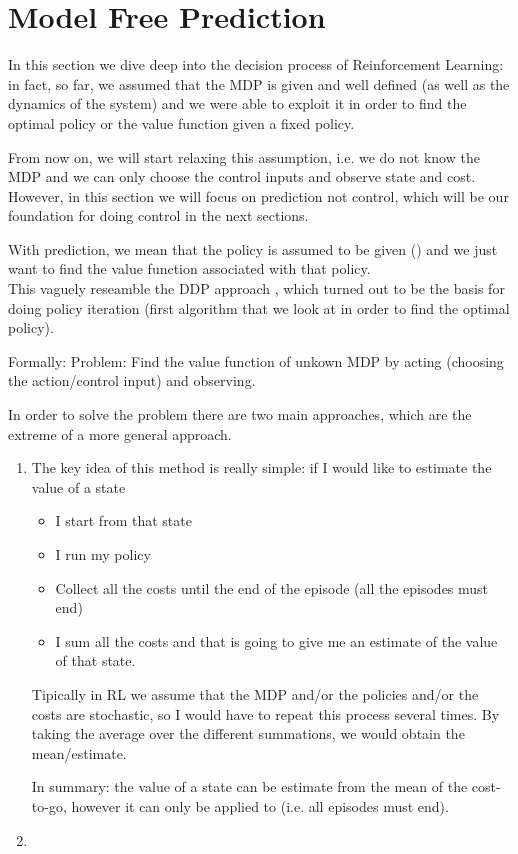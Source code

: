 \section{Model Free Prediction}
In this section we dive deep into the decision process of Reinforcement Learning: in fact, so far, we assumed that the MDP is given and well defined (as well as the dynamics of the system) and we were able to exploit it in order to find the optimal policy or the value function given a fixed policy.

From now on, we will start relaxing this assumption, i.e. we do not know the MDP and we can only choose the control inputs and observe state and cost.\\
However, in this section we will focus on prediction not control, which will be our foundation for doing control in the next sections.

With prediction, we mean that the policy is assumed to be given () and we just want to find the value function associated with that policy.\\
This vaguely reseamble the DDP approach , which turned out to be the basis for doing policy iteration (first algorithm that we look at in order to find the optimal policy).

Formally:
Problem: Find the value function of unkown MDP by acting (choosing the action/control input) and observing. 

In order to solve the problem there are two main approaches, which are the extreme of a more general approach.
\begin{enumerate}
\item {}

The key idea of this method is really simple: if I would like to estimate the value of a state
\begin{itemize}
\item I start from that state
\item I run my policy
\item Collect all the costs until the end of the episode (all the episodes must end)
\item I sum all the costs and that is going to give me an estimate of the value of that state.
\end{itemize}

Tipically in RL we assume that the MDP and/or the policies and/or the costs are stochastic, so I would have to repeat this process several times. By taking the average over the different summations, we would obtain the mean/estimate.

In summary: the value of a state can be estimate from the mean of the cost-to-go, however it can only be applied to  (i.e. all episodes must end).
\item {}
\end{enumerate}



